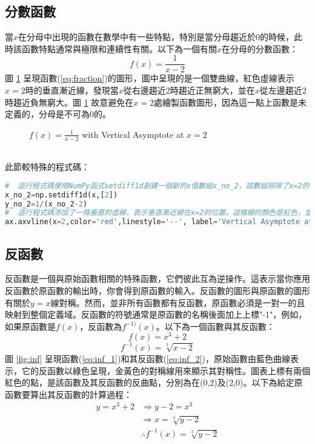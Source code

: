 \subsection{分數函數}
當$x$在分母中出現的函數在數學中有一些特點，特別是當分母趨近於0的時候，此時該函數特點通常與極限和連續性有關。以下為一個有關$x$在分母的分數函數：
\begin{equation}\label{eq:fraction}
f(x)= \frac{1}{x - 2}
\end{equation}
圖 \ref{fig:fraction} 呈現函數(\ref{eq:fraction})的圖形，圖中呈現的是一個雙曲線，紅色虛線表示$x=2$時的垂直漸近線，發現當$x$從右邊趨近2時趨近正無窮大，並在$x$從左邊趨近2時趨近負無窮大。圖 \ref{fig:fraction} 故意避免在$x=2$處繪製函數圖形，因為這一點上函數是未定義的，分母是不可為0的。
\begin{figure}[h]
    \caption{$f(x) = \frac{1}{x - 2}$ with Vertical Asymptote at $x=2$}
    \label{fig:fraction}
\end{figure}\\
此節較特殊的程式碼：
\begin{lstlisting}[language=Python]
#  這行程式碼使用NumPy函式setdiff1d創建一個新的x值數組x_no_2，該數組排除了x=2的值。這是為了避免分母為零，因為在x=2時，分母等於零，這會導致無定義的情況。
x_no_2=np.setdiff1d(x,[2])
y_no_2=1/(x_no_2-2)
#  這行程式碼添加了一條垂直的虛線，表示垂直漸近線在x=2的位置。這條線的顏色是紅色，並且使用虛線樣式。同時，它的標籤說明了這是在 x=2 的位置的垂直漸近線。
ax.axvline(x=2,color='red',linestyle='--', label='Vertical Asymptote at x=2')
\end{lstlisting}
\subsection{反函數}
反函數是一個與原始函數相關的特殊函數，它們彼此互為逆操作。這表示當你應用反函數於原函數的輸出時，你會得到原函數的輸入。反函數的圖形與原函數的圖形有關於$y=x$線對稱。然而，並非所有函數都有反函數，原函數必須是一對一的且映射到整個定義域。反函數的符號通常是原函數的名稱後面加上上標"-1"，例如，如果原函數是$f(x)$，反函數為$f^{-1)}(x)$。以下為一個函數與其反函數：
\begin{equation}\label{eq:inf_1}
f(x)=x^3+2
\end{equation}
\begin{equation}\label{eq:inf_2}
f^{-1}(x)=\sqrt[3]{x - 2}
\end{equation}
圖 \ref{fig:inf} 呈現函數(\ref{eq:inf_1})和其反函數(\ref{eq:inf_2})，原始函數由藍色曲線表示，它的反函數以綠色呈現，金黃色的對稱線用來顯示其對稱性。圖表上標有兩個紅色的點，是該函數及其反函數的反曲點，分別為在(0,2)及(2,0)。以下為給定原函數要算出其反函數的計算過程：
\begin{align*}
y=x^3+2
&\Rightarrow y-2=x^3\\
&\Rightarrow x=\sqrt[3]{y-2}\\
&\therefore f^{-1}(x)=\sqrt[3]{y-2}\\
\end{align*}


